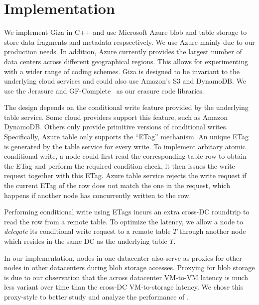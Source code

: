\section{Implementation}
We implement Giza in C++ and use Microsoft Azure blob and table storage to store data fragments and metadata respsectively. We use Azure mainly 
due to our production needs. In addition, Azure currently provides the largest number 
of data centers across different geographical regions. This allows for experimenting 
with a wider range of coding schemes. Giza is designed to be invariant to the 
underlying cloud services and could also use Amazon's S3 and DynamoDB. 
We use the Jerasure and GF-Complete~\cite{Jerasure} as our erasure code libraries.

The \name design depends on the conditional write feature provided by the underlying 
table service. Some cloud providers support this feature, such as Amazon DynamoDB.
Others only provide primitive versions of conditional writes. Specifically, 
Azure table only supports the ``ETag'' mechanism. An unique ETag 
is generated by the table service for every write.  To implement arbitary atomic
conditional write, a \name node could first read the corresponding table row to
obtain the ETag and perform the required condition check, it then issues the
write request together with this ETag.  Azure table service rejects the
write request if the current ETag of the row does not match the one in the
request, which happens if another \name node has concurrently written to the row.  

Performing conditional write using ETags 
incurs an extra cross-DC roundtrip to read the row from a remote table.
To optimize the latency, we allow a \name node to \emph{delegate} its 
conditional write request to a remote table $T$ through another node which
resides in the same DC as the underlying table $T$.  

In our implementation, \name nodes in one datacenter also serve as proxies for
other nodes in other datacenters during blob storage accesses.  Proxying for
blob storage is due to our observation that the across datacenter VM-to-VM
latency is much less variant over time than the cross-DC VM-to-storage latency.
We chose this proxy-style to better study and analyze the performance of \name.

